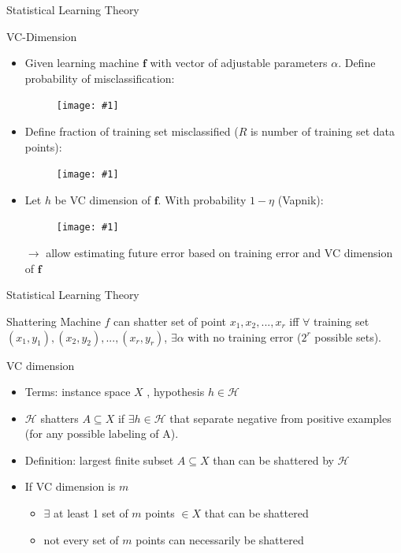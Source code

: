 \documentclass[9pt,t]{beamer}
\newcommand{\picEqHereWidth}[2] { %
    \begin{figure}[htp] 
        \centering
        \texttt{[image: \#1]}
    \end{figure}
}
\begin{document}
\begin{frame}{Statistical Learning Theory}
    \begin{alertblock}{VC-Dimension}
        \begin{itemize}
            \item Given learning machine $ \mathbf{f} $ with vector of adjustable parameters $ \alpha $. Define probability of misclassification:
            \picEqHereWidth{prob_misclass.png}{0.6\linewidth}
            \item Define fraction of training set misclassified ($ R $ is number of training set data points):
            \picEqHereWidth{prob_train_misclass.png}{0.7\linewidth}
            \item Let $ h $ be VC dimension of $ \mathbf{f} $. With probability $ 1 - \eta $ (Vapnik):
            \picEqHereWidth{prob_misclass_vapnik}{0.8\linewidth}
            $ \rightarrow $ allow estimating future error based on training error and VC dimension of $ \mathbf{f} $
        \end{itemize}
    \end{alertblock}
\end{frame}

\begin{frame}{Statistical Learning Theory}
    \begin{alertblock}{Shattering}
        Machine $ f $ can shatter set of point $ x_1, x_2, ..., x_r $ iff $ \forall $ training set $ (x_1, y_1), (x_2, y_2), ... , (x_r, y_r) $, $ \exists \alpha $ with no training error ($ 2^r $ possible sets).
    \end{alertblock}
    \begin{alertblock}{VC dimension}
        \begin{itemize}
            \item Terms: instance space $ X $ , hypothesis $ h \in \mathcal{H} $
            \item $ \mathcal{H} $ shatters $ A \subseteq X $ if $ \exists h \in \mathcal{H} $ that separate negative from positive examples (for any possible labeling of A).
            \item Definition: largest finite subset $ A \subseteq X $ than can be shattered by $ \mathcal{H} $
            \item If VC dimension is $ m $
            \begin{itemize}
                \item $ \exists $ at least 1 set of $ m $ points $ \in X $ that can be shattered
                \item not every set of $ m $ points can necessarily be shattered
            \end{itemize}
        \end{itemize}
    \end{alertblock}
\end{frame}
\end{document}
